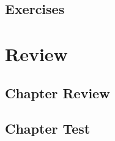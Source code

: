 \subsection{Exercises}
\noindent{}


\newpage
\section{Review}
\subsection{Chapter Review}
\subsection{Chapter Test}